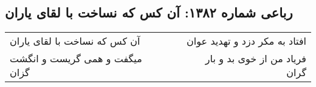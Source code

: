 \begin{center}
\section*{رباعی شماره ۱۳۸۲: آن کس که نساخت با لقای یاران}
\label{sec:1382}
\begin{longtable}{l p{0.5cm} r}
آن کس که نساخت با لقای یاران
&&
افتاد به مکر دزد و تهدید عوان
\\
میگفت و همی گریست و انگشت گزان
&&
فریاد من از خوی بد و بار گران
\\
\end{longtable}
\end{center}
